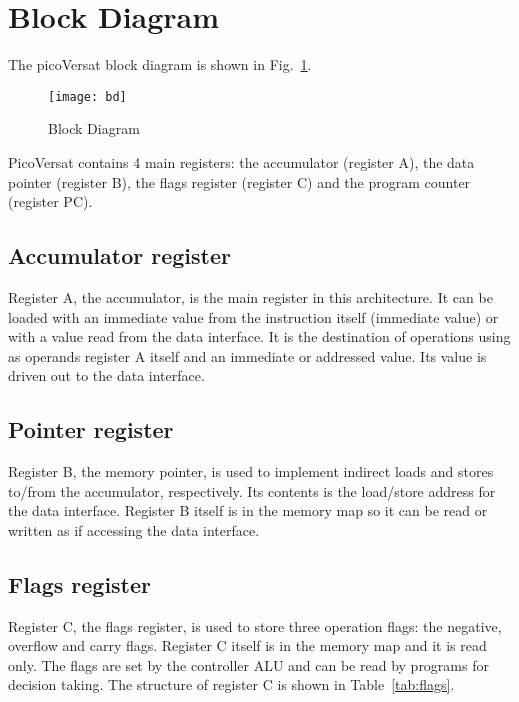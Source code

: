\section{Block Diagram}

The picoVersat block diagram is shown in Fig.~\ref{fig:bd}.

\begin{figure}[!htbp]
    \centerline{\texttt{[image: bd]}}
    \vspace{0cm}\caption{Block Diagram}
    \label{fig:bd}
\end{figure}


PicoVersat contains 4 main registers: the accumulator (register A), the data
pointer (register B), the flags register (register C) and the program counter
(register PC).

\subsection{Accumulator register}

Register A, the accumulator, is the main register in this architecture. It can
be loaded with an immediate value from the instruction itself (immediate value)
or with a value read from the data interface. It is the destination of
operations using as operands register A itself and an immediate or addressed
value. Its value is driven out to the data interface.

\subsection{Pointer register}

Register B, the memory pointer, is used to implement indirect loads and
stores to/from the accumulator, respectively. Its contents is the
load/store address for the data interface. Register B itself is in the memory
map so it can be read or written as if accessing the data interface.

\subsection{Flags register}

Register C, the flags register, is used to store three operation
flags: the negative, overflow and carry flags. Register C itself is in
the memory map and it is read only. The flags are set by the
controller ALU and can be read by programs for decision taking. The
structure of register C is shown in Table~\ref{tab:flags}.

